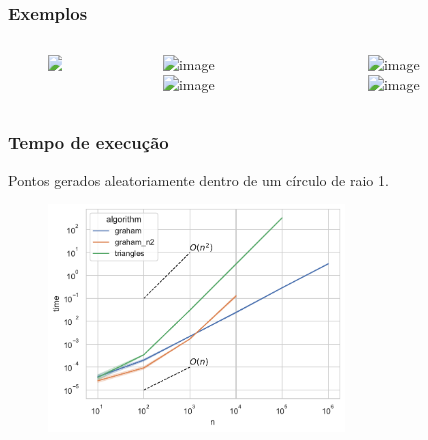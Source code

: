 \documentclass[aspectratio=169,usenames,dvipsnames]{beamer}
\begin{document}
\begin{frame}
  \frametitle{Exemplos}
  \begin{overprint}
    \begin{columns}
      \begin{column}{0.33\textwidth}
        \begin{figure}
          \includegraphics<1->[width=\textwidth]{figs/dogsbs_graham_pointsonly.png}
        \end{figure}
      \end{column}
      \begin{column}{0.33\textwidth}
        \begin{figure}
          \includegraphics<2>[width=\textwidth]{./figs/dogsbs_trig.png}
          \includegraphics<3>[width=\textwidth]{./figs/dogsbs_trig_adj.png}
        \end{figure}
      \end{column}
      \begin{column}{0.33\textwidth}
        \begin{figure}
          \includegraphics<2>[width=\textwidth]{./figs/dogsbs_graham.png}
          \includegraphics<3>[width=\textwidth]{./figs/dogsbs_graham_adj.png}
        \end{figure}
      \end{column}
    \end{columns}
  \end{overprint}
\end{frame}


\begin{frame}
\frametitle{Tempo de execução}
    Pontos gerados aleatoriamente dentro de um círculo de raio 1.
    \begin{figure}
        \includegraphics[width=0.7\textwidth]{./figs/time.pdf}
    \end{figure}
\end{frame}
\end{document}
